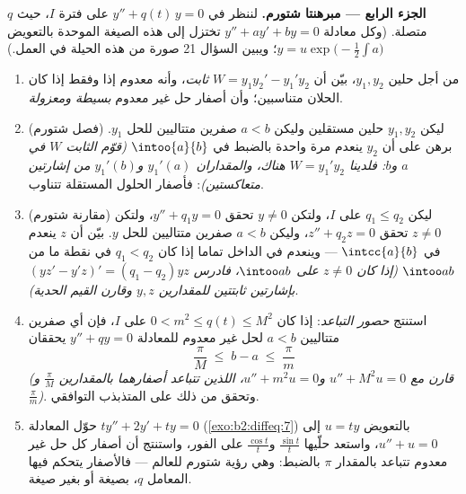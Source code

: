 \begin{problem}
\medskip
\noindent\textbf{الجزء الرابع --- مبرهنتا شتورم.} لننظر في $y''
+ q(t)\,y = 0$
على فترة $I$، حيث $q$ متصلة. (وكل معادلة $y'' + ay' + by = 0$ تختزل إلى
هذه الصيغة الموحدة بالتعويض $y = u\exp\bigl(-\frac12\int a\bigr)$؛ ويبين السؤال 21 صورة من هذه
الحيلة في العمل.)
\begin{enumerate}[resume]
  \item من أجل حلين $y_1, y_2$، بيّن أن  $W = y_1y_2' - y_1'y_2$ \emph{ثابت}،
        وأنه معدوم إذا وفقط إذا كان الحلان متناسبين؛ وأن أصفار حل
        غير معدوم \emph{بسيطة ومعزولة}.
  \item (فصل شتورم) ليكن $y_1, y_2$ حلين مستقلين وليكن $a < b$ صفرين
        متتاليين للحل $y_1$. برهن على أن $y_2$ ينعدم مرة واحدة
        بالضبط في $\intoo{a}{b}$ \emph{(قوّم الثابت $W$ في $a$
        و$b$: فلدينا $W = y_1'y_2$ هناك، والمقداران $y_1'(a)$ و$y_1'(b)$ من
        إشارتين متعاكستين)}: فأصفار الحلول المستقلة تتناوب.
  \item (مقارنة شتورم) ليكن $q_1 \leq q_2$ على $I$، ولتكن $y \neq
        0$ تحقق
        $y'' + q_1y = 0$، ولتكن $z \neq 0$ تحقق $z'' + q_2z
        = 0$، وليكن $a < b$ صفرين
        متتاليين للحل $y$. بيّن أن $z$ ينعدم في $\intcc{a}{b}$ ---
        وينعدم في الداخل تماما إذا كان $q_1 < q_2$ في نقطة ما من $\intoo ab$
        \emph{(إذا كان $z \neq
        0$ على $\intoo ab$، فادرس $(yz' - y'z)' = (q_1 -
        q_2)yz$ بإشارتين
        ثابتتين للمقدارين $y, z$ وقارن القيم الحدية)}.
  \item استنتج \emph{حصور التباعد}: إذا كان $0 < m^2 \leq
        q(t) \leq M^2$ على $I$، فإن
        أي صفرين متتاليين $a < b$ لحل غير معدوم للمعادلة $y'' + qy = 0$
        يحققان
        \[
        \frac{\pi}{M} \;\leq\; b - a \;\leq\; \frac{\pi}{m}
        \]
        \emph{(قارن مع $u'' + M^2u = 0$ و$u'' + m^2u
        = 0$، اللذين تتباعد أصفارهما
        بالمقدارين $\frac\pi M$ و$\frac\pi m$)}. وتحقق من ذلك على المتذبذب
        التوافقي.
  \item حوّل المعادلة $ty'' + 2y' + ty = 0$ (\cref{exo:b2:diffeq:7}) بالتعويض $u = ty$ إلى $u'' + u =
        0$،
        واستعد حلّيها $\frac{\sin t}t$ و$\frac{\cos t}{t}$ على الفور، واستنتج أن أصفار كل
        حل غير معدوم تتباعد بالمقدار $\pi$ بالضبط: وهي رؤية شتورم
        للعالم --- فالأصفار يتحكم فيها المعامل $q$، بصيغة أو
        بغير صيغة.
\end{enumerate}


\end{problem}
